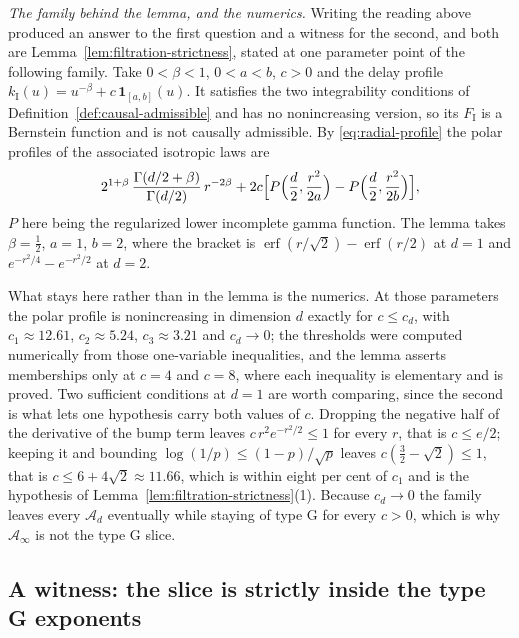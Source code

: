 \begin{remark}
\emph{The family behind the lemma, and the numerics.} Writing the reading above produced an
answer to the first question and a witness for the second, and both are
Lemma~\ref{lem:filtration-strictness}, stated at one parameter point of the following family. Take
$0 < \beta < 1$, $0 < a < b$, $c > 0$ and the delay profile
$k_{\mathrm I}(u) = u^{-\beta} + c\,\mathbf{1}_{[a,b]}(u)$. It satisfies the two integrability
conditions of Definition~\ref{def:causal-admissible} and has no nonincreasing version, so its
$F_{\mathrm I}$ is a Bernstein function and is not causally admissible. By
\ref{eq:radial-profile} the polar profiles of the associated isotropic laws are
\[
  2^{1+\beta}\,\frac{\Gamma(d/2+\beta)}{\Gamma(d/2)}\,r^{-2\beta}
   + 2c\Bigl[P\Bigl(\frac d2,\frac{r^2}{2a}\Bigr)
            - P\Bigl(\frac d2,\frac{r^2}{2b}\Bigr)\Bigr],
\]
$P$ here being the regularized lower incomplete gamma function. The lemma takes
$\beta = \tfrac12$, $a = 1$, $b = 2$, where the bracket is
$\operatorname{erf}(r/\sqrt2) - \operatorname{erf}(r/2)$ at $d = 1$ and
$e^{-r^2/4} - e^{-r^2/2}$ at $d = 2$.

What stays here rather than in the lemma is the numerics. At those parameters the polar profile
is nonincreasing in dimension $d$ exactly for $c \le c_d$, with $c_1 \approx 12.61$,
$c_2 \approx 5.24$, $c_3 \approx 3.21$ and $c_d \to 0$; the thresholds were computed numerically
from those one-variable inequalities, and the lemma asserts memberships only at $c = 4$ and
$c = 8$, where each inequality is elementary and is proved. Two sufficient conditions at $d = 1$
are worth comparing, since the second is what lets one hypothesis carry both values of $c$.
Dropping the negative half of the derivative of the bump term leaves $c\,r^2e^{-r^2/2} \le 1$ for
every $r$, that is $c \le e/2$; keeping it and bounding $\log(1/p) \le (1-p)/\sqrt p$ leaves
$c(\tfrac32 - \sqrt2) \le 1$, that is $c \le 6 + 4\sqrt2 \approx 11.66$, which is within eight per
cent of $c_1$ and is the hypothesis of Lemma~\ref{lem:filtration-strictness}(1). Because $c_d \to 0$ the
family leaves every $\mathcal{A}_d$ eventually while staying of type G for every $c > 0$, which is
why $\mathcal{A}_\infty$ is not the type G slice.
\end{remark}

\subsection{A witness: the slice is strictly inside the type G exponents}\label{sec:witness}

